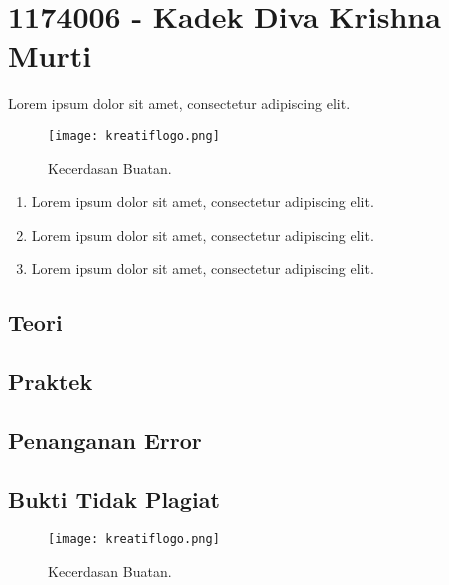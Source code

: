 \section{1174006 - Kadek Diva Krishna Murti}
Lorem ipsum dolor sit amet, consectetur adipiscing elit.


\hfill\break
\begin{figure}[H]
    \texttt{[image: kreatiflogo.png]}
    \centering
    \caption{Kecerdasan Buatan.}
\end{figure}

\begin{enumerate}
	\item Lorem ipsum dolor sit amet, consectetur adipiscing elit.
	\item Lorem ipsum dolor sit amet, consectetur adipiscing elit.
	\item Lorem ipsum dolor sit amet, consectetur adipiscing elit.
\end{enumerate}

\subsection{Teori}

\subsection{Praktek}

\subsection{Penanganan Error}

\subsection{Bukti Tidak Plagiat}
\begin{figure}[H]
	\texttt{[image: kreatiflogo.png]}
	\centering
	\caption{Kecerdasan Buatan.}
\end{figure}